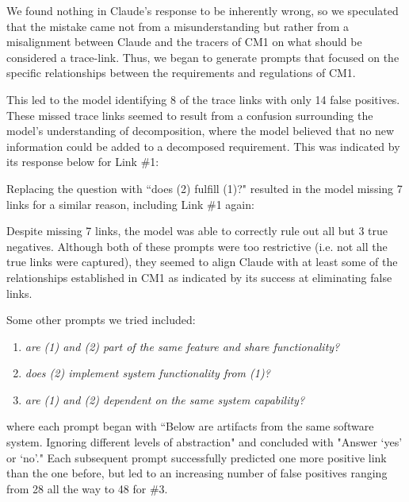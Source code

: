 We found nothing in Claude's response to be inherently wrong, so we speculated that the mistake came not from a misunderstanding but rather from a misalignment between Claude and the tracers of CM1 on what should be considered a trace-link. Thus, we began to generate prompts that focused on the specific relationships between the requirements and regulations of CM1.

This led to the model identifying 8 of the trace links with only 14 false positives. These missed trace links seemed to result from a confusion surrounding the model's understanding of decomposition, where the model believed that no new information could be added to a decomposed requirement. This was indicated by its response below for Link \#1:


Replacing the question with ``does (2) fulfill (1)?" resulted in the model missing 7 links for a similar reason, including Link \#1 again:


Despite missing 7 links, the model was able to correctly rule out all but 3 true negatives. Although both of these prompts were too restrictive (i.e. not all the true links were captured), they seemed to align Claude with at least some of the relationships established in CM1 as indicated by its success at eliminating false links.

Some other prompts we tried included:
\begin{enumerate}[label=\arabic*.]
    \item \textit{are (1) and (2) part of the same feature and share functionality?}
    \item \textit{does (2) implement system functionality from (1)?}
    \item \textit{are (1) and (2) dependent on the same system capability?}
\end{enumerate}
where each prompt began with ``Below are artifacts from the same software system. Ignoring different levels of abstraction" and concluded with "Answer `yes' or `no'." Each subsequent prompt successfully predicted one more positive link than the one before, but led to an increasing number of false positives ranging from 28 all the way to 48 for \#3. 

